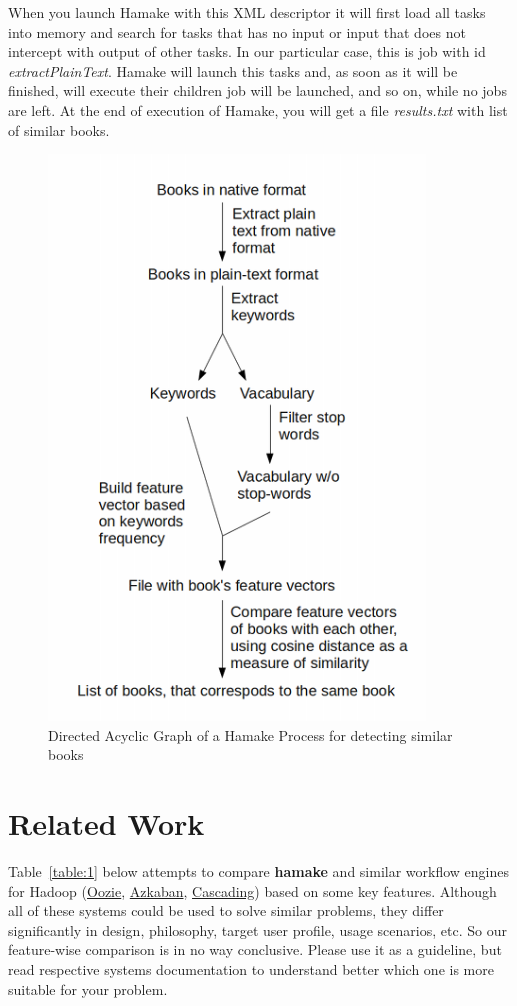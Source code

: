 \documentclass{article}
\begin{document}
When you launch Hamake with this XML descriptor it will first load all
tasks into memory and search for tasks that has no input or input that
does not intercept with output of other tasks. In our particular case, 
this is job with id \textit{extractPlainText}. Hamake will launch this tasks and,
as soon as it will be finished, will execute their children job will be launched, and so on,
while no jobs are left. At the end of execution of Hamake, you will get 
a file \textit{results.txt} with list of similar books.

\begin{figure}[htp]
\centering
\includegraphics[width=10cm]{SimilarityAlgDAG.png}
\caption{Directed Acyclic Graph of a Hamake Process for detecting similar books}
\label{fig:SimilarityAlgDAG}
\end{figure}

\section{Related Work}

Table~\ref{table:1} below attempts to compare \textbf{hamake} and similar
workflow engines for Hadoop
(\href{http://github.com/tucu00/oozie1}{Oozie},
\href{http://sna-projects.com/azkaban/}{Azkaban},
\href{http://www.cascading.org/}{Cascading}) based on some key
features. Although all of these systems could be used to solve similar
problems, they differ significantly in design, philosophy, target user
profile, usage scenarios, etc.  So our feature-wise comparison is in
no way conclusive. Please use it as a guideline, but read respective
systems documentation to understand better which one is more suitable
for your problem.
\end{document}
